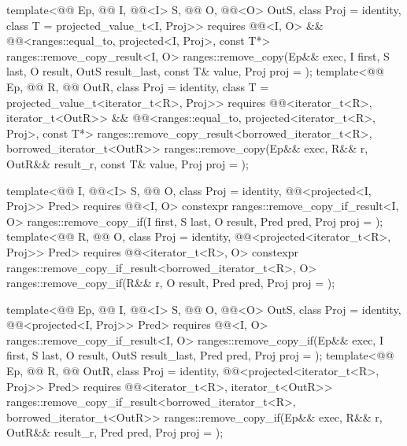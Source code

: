 \begin{itemdecl}
template<@@ Ep, @@ I, @@<I> S,
         @@ O, @@<O> OutS,
         class Proj = identity, class T = projected_value_t<I, Proj>>
  requires @@<I, O> &&
           @@<ranges::equal_to, projected<I, Proj>, const T*>
  ranges::remove_copy_result<I, O>
    ranges::remove_copy(Ep&& exec, I first, S last, O result, OutS result_last,
                        const T& value, Proj proj = {});
template<@@ Ep, @@ R, @@ OutR,
         class Proj = identity, class T = projected_value_t<iterator_t<R>, Proj>>
  requires @@<iterator_t<R>, iterator_t<OutR>> &&
           @@<ranges::equal_to,
                                     projected<iterator_t<R>, Proj>, const T*>
  ranges::remove_copy_result<borrowed_iterator_t<R>, borrowed_iterator_t<OutR>>
    ranges::remove_copy(Ep&& exec, R&& r, OutR&& result_r, const T& value, Proj proj = {});

template<@@ I, @@<I> S, @@ O,
         class Proj = identity, @@<projected<I, Proj>> Pred>
  requires @@<I, O>
  constexpr ranges::remove_copy_if_result<I, O>
    ranges::remove_copy_if(I first, S last, O result, Pred pred, Proj proj = {});
template<@@ R, @@ O, class Proj = identity,
         @@<projected<iterator_t<R>, Proj>> Pred>
  requires @@<iterator_t<R>, O>
  constexpr ranges::remove_copy_if_result<borrowed_iterator_t<R>, O>
    ranges::remove_copy_if(R&& r, O result, Pred pred, Proj proj = {});

template<@@ Ep, @@ I, @@<I> S,
         @@ O, @@<O> OutS,
         class Proj = identity, @@<projected<I, Proj>> Pred>
  requires @@<I, O>
  ranges::remove_copy_if_result<I, O>
    ranges::remove_copy_if(Ep&& exec, I first, S last, O result, OutS result_last,
                           Pred pred, Proj proj = {});
template<@@ Ep, @@ R, @@ OutR,
         class Proj = identity,
         @@<projected<iterator_t<R>, Proj>> Pred>
  requires @@<iterator_t<R>, iterator_t<OutR>>
  ranges::remove_copy_if_result<borrowed_iterator_t<R>, borrowed_iterator_t<OutR>>
    ranges::remove_copy_if(Ep&& exec, R&& r, OutR&& result_r, Pred pred, Proj proj = {});
\end{itemdecl}

